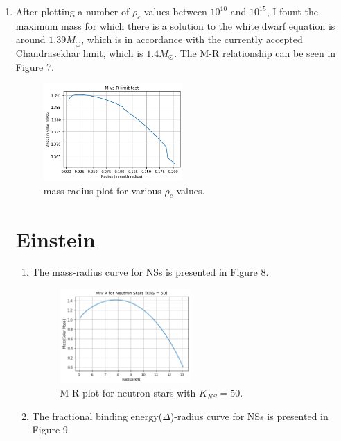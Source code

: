 \documentclass[aps,twocolumn,showpacs,preprintnumbers,nofootinbib,prl,superscriptaddress,groupedaddress]{revtex4-2}
\begin{document}
\begin{enumerate}[label=(\alph*)]
    \item After plotting a number of $\rho_{c}$ values between $10^{10}$ and $10^{15}$, I fount the maximum mass for which there is a solution to the white dwarf equation is around $1.39M_{\odot}$, which is in accordance with the currently accepted Chandrasekhar limit, which is $1.4M_{\odot}$. The M-R relationship can be seen in Figure 7.
    
    \begin{figure}[H] 
    \centering
    \includegraphics[width=0.5\textwidth]{chandra_m.png}
    \caption{mass-radius plot for various $\rho_{c}$ values.}
    \end{figure}      
    
\section{Einstein}


    \begin{enumerate}[label=(\alph*)]
        \item The mass-radius curve for NSs is presented in Figure 8.
        \begin{figure}[H] 
        \centering
        \includegraphics[width=0.5\textwidth]{MRNS50.png}
        \caption{M-R plot for neutron stars with $K_{NS} = 50$.}
        \end{figure} 
        
        \item The fractional binding energy($\Delta$)-radius curve for NSs is presented in Figure 9.
        

\end{enumerate}
\end{enumerate}
\end{document}
